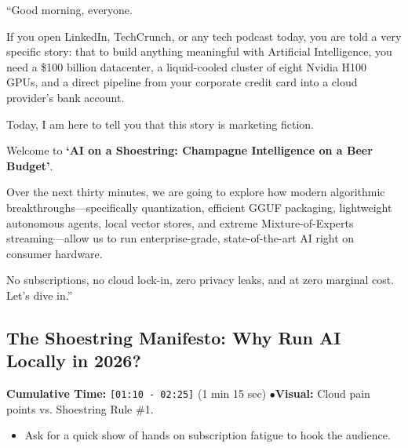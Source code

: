 \documentclass[11pt,a4paper]{article}
\begin{document}
\begin{speechbox}
``Good morning, everyone.

If you open LinkedIn, TechCrunch, or any tech podcast today, you are told a very specific story: that to build anything meaningful with Artificial Intelligence, you need a \$100 billion datacenter, a liquid-cooled cluster of eight Nvidia H100 GPUs, and a direct pipeline from your corporate credit card into a cloud provider's bank account.

Today, I am here to tell you that this story is marketing fiction.

Welcome to \textbf{`AI on a Shoestring: Champagne Intelligence on a Beer Budget'}.

Over the next thirty minutes, we are going to explore how modern algorithmic breakthroughs---specifically quantization, efficient GGUF packaging, lightweight autonomous agents, local vector stores, and extreme Mixture-of-Experts streaming---allow us to run enterprise-grade, state-of-the-art AI right on consumer hardware. 

No subscriptions, no cloud lock-in, zero privacy leaks, and at zero marginal cost. Let's dive in.''
\end{speechbox}

\subsection{The Shoestring Manifesto: Why Run AI Locally in 2026?}
\begin{directionbox}
    \textbf{Cumulative Time:} \texttt{[01:10 - 02:25]} (1 min 15 sec) \quad$\bullet$\quad \textbf{Visual:} Cloud pain points vs. Shoestring Rule \#1.
    \begin{itemize}
        \item Ask for a quick show of hands on subscription fatigue to hook the audience.
    \end{itemize}
\end{directionbox}
\end{document}
